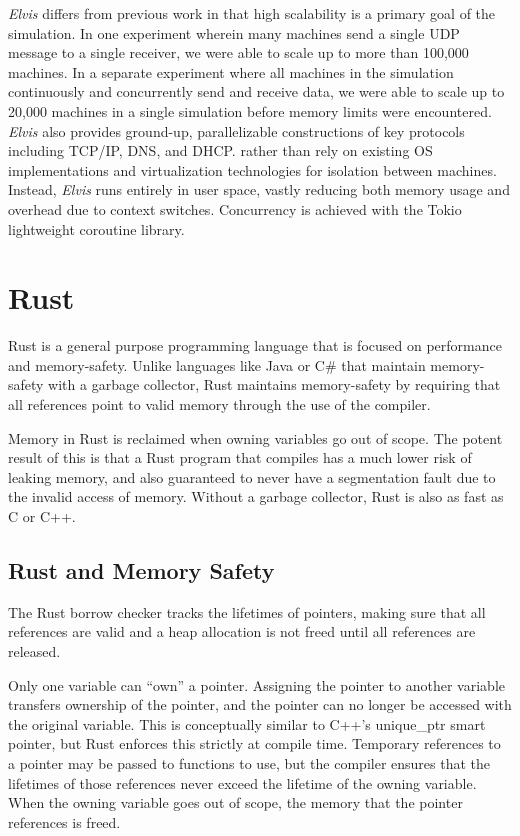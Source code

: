 \documentclass[journal]{IEEEtran} %
\newcommand{\elvis}{\textit{Elvis}}
\begin{document}
\elvis{} differs from previous work in that high scalability is a primary goal of the simulation. In one experiment wherein many machines send a single UDP message to a single receiver, we were able to scale up to more than 100,000 machines. In a separate experiment where all machines in the simulation continuously and concurrently send and receive data, we were able to scale up to 20,000 machines in a single simulation before memory limits were encountered. \elvis{} also provides ground-up, parallelizable constructions of key protocols including TCP/IP, DNS, and DHCP. rather than rely on existing OS implementations and virtualization technologies for isolation between machines. Instead, \elvis{} runs entirely in user space, vastly reducing both memory usage and overhead due to context switches. Concurrency is achieved with the Tokio\cite{tokio} lightweight coroutine library.

\section{Rust}

Rust is a general purpose programming language that is focused on performance and memory-safety. Unlike languages like Java or C\# that maintain memory-safety with a garbage collector, Rust maintains memory-safety by requiring that all references point to valid memory through the use of the compiler.

Memory in Rust is reclaimed when owning variables go out of scope. The potent result of this is that a Rust program that compiles has a much lower risk of leaking memory,  and also guaranteed to never have a segmentation fault due to the invalid access of memory. Without a garbage collector, Rust is also as fast as C or C++\cite{rust-speed}.


\subsection{Rust and Memory Safety}

The Rust borrow checker tracks the lifetimes of pointers, making sure that all references are valid and a heap allocation is not freed until all references are released.

Only one variable can ``own'' a pointer. Assigning the pointer to another variable transfers ownership of the pointer, and the pointer can no longer be accessed with the original variable. This is conceptually similar to C++'s unique\_ptr smart pointer, but Rust enforces this strictly at compile time. Temporary references to a pointer may be passed to functions to use, but the compiler ensures that the lifetimes of those references never exceed the lifetime of the owning variable. When the owning variable goes out of scope, the memory that the pointer references is freed.
\end{document}
